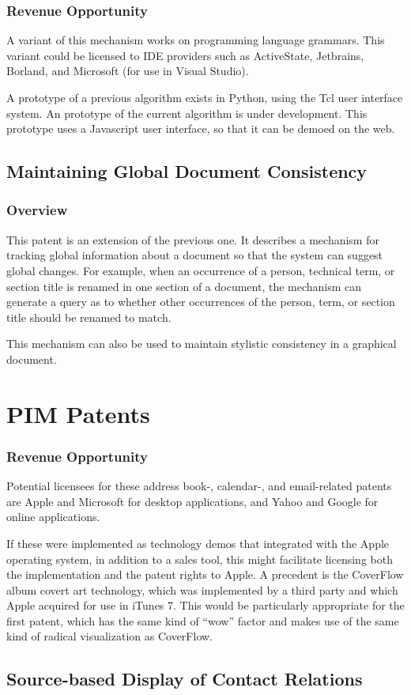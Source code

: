 \documentclass{article}
\newcommand{\poverview}{\subsubsection{Overview}}
\newcommand{\prevenue}{\subsubsection{Revenue Opportunity}}
\begin{document}
\prevenue
A variant of this mechanism works on programming language grammars.  This variant could be licensed to IDE providers such as ActiveState, Jetbrains, Borland, and Microsoft (for use in Visual Studio). 

A prototype of a previous algorithm exists in Python, using the Tcl user interface system.  An prototype of the current algorithm is under development.  This prototype uses a Javascript user interface, so that it can be demoed on the web.


\subsection{Maintaining Global Document Consistency}
\poverview
This patent is an extension of the previous one.  It describes a mechanism for tracking global information about a document so that the system can suggest global changes.  For example, when an occurrence of a person, technical term, or section title is renamed in one section of a document, the mechanism can generate a query as to whether other occurrences of the person, term, or section title should be renamed to match.

This mechanism can also be used to maintain stylistic consistency in a graphical document.


\section{PIM Patents}

\prevenue
Potential licensees for these address book-, calendar-, and email-related patents are Apple and Microsoft for desktop applications, and Yahoo and Google for online applications.

If these were implemented as technology demos that integrated with the Apple operating system, in addition to a sales tool, this might facilitate licensing both the implementation and the patent rights to Apple.  A precedent is the CoverFlow album covert art technology, which was implemented by a third party and which Apple acquired for use in iTunes 7.  This would be particularly appropriate for the first patent, which has the same kind of ``wow'' factor and makes use of the same kind of radical visualization as CoverFlow.

\subsection{Source-based Display of Contact Relations}
\end{document}
